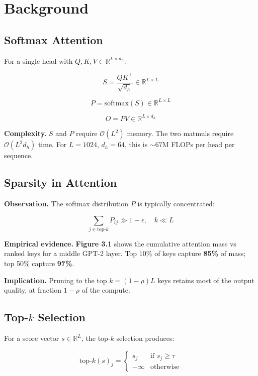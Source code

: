 
\section{Background}

\subsection{Softmax Attention}

For a single head with $Q, K, V \in \mathbb{R}^{L \times d_h}$:

\[
S = \frac{Q K^\top}{\sqrt{d_h}} \in \mathbb{R}^{L \times L}
\]

\[
P = \text{softmax}(S) \in \mathbb{R}^{L \times L}
\]

\[
O = P V \in \mathbb{R}^{L \times d_h}
\]

\textbf{Complexity.} $S$ and $P$ require $\mathcal{O}(L^2)$ memory. The two 
matmuls require $\mathcal{O}(L^2 d_h)$ time. For $L = 1024$, $d_h = 64$, 
this is $\sim 67$M FLOPs per head per sequence.

\subsection{Sparsity in Attention}

\textbf{Observation.} The softmax distribution $P$ is typically concentrated:

\[
\sum_{j \in \text{top-}k} P_{ij} \gg 1 - \epsilon, \quad k \ll L
\]

\textbf{Empirical evidence.} \textbf{Figure 3.1} shows the cumulative attention mass 
vs ranked keys for a middle GPT-2 layer. Top 10\% of keys capture 
\textbf{85\%} of mass; top 50\% capture \textbf{97\%}.

\textbf{Implication.} Pruning to the top $k = (1 - \rho) L$ keys retains most 
of the output quality, at fraction $1 - \rho$ of the compute.

\subsection{Top-$k$ Selection}

For a score vector $s \in \mathbb{R}^L$, the top-$k$ selection produces:

\[
\text{top-}k(s)_j = \begin{cases} s_j & \text{if } s_j \geq \tau \\ -\infty & \text{otherwise} \end{cases}
\]

